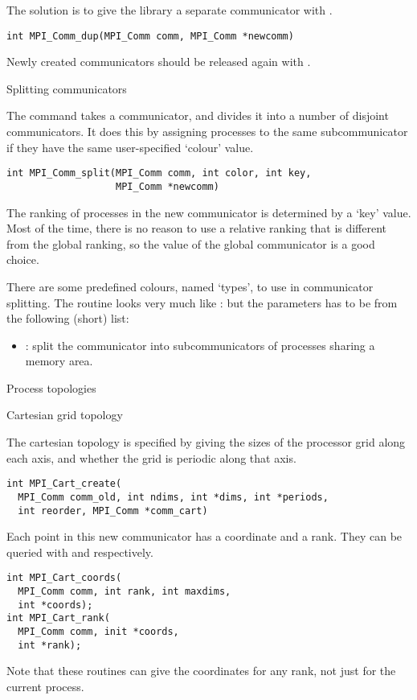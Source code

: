 The solution is to give the library a separate communicator with
.
\begin{verbatim}
int MPI_Comm_dup(MPI_Comm comm, MPI_Comm *newcomm)
\end{verbatim}
Newly created communicators should be
released again with .


 {Splitting communicators}

The command  takes a communicator, and
divides it into a number of disjoint communicators. It does this by
assigning processes to the same subcommunicator if they have the same
user-specified `colour' value.
\begin{verbatim}
int MPI_Comm_split(MPI_Comm comm, int color, int key, 
                   MPI_Comm *newcomm)
\end{verbatim}
The ranking of processes in the new communicator is determined by a `key' value.
Most of the time, there is no reason to use a relative ranking that is different from
the global ranking, so the  value of the global communicator
is a good choice.

There are some predefined colours, named `types', to use in communicator splitting.
The routine  looks very much like :
%
%
but the  parameters has to be from the following (short) list:
\begin{itemize}
\item {}: split the communicator into subcommunicators
  of processes sharing a memory area.
\end{itemize}

 {Process topologies}

 {Cartesian grid topology}

The cartesian topology is specified by giving
 the sizes of the processor grid along
each axis, and whether the grid is periodic along that axis.
\begin{verbatim}
int MPI_Cart_create(
  MPI_Comm comm_old, int ndims, int *dims, int *periods, 
  int reorder, MPI_Comm *comm_cart)
\end{verbatim}
Each point in this new communicator has a coordinate and a rank.  They
can be queried with  and
 respectively.
\begin{verbatim}
int MPI_Cart_coords(
  MPI_Comm comm, int rank, int maxdims,
  int *coords);
int MPI_Cart_rank(
  MPI_Comm comm, init *coords, 
  int *rank);
\end{verbatim}
Note that these routines can give the coordinates for any rank,
not just for the current process.
%

